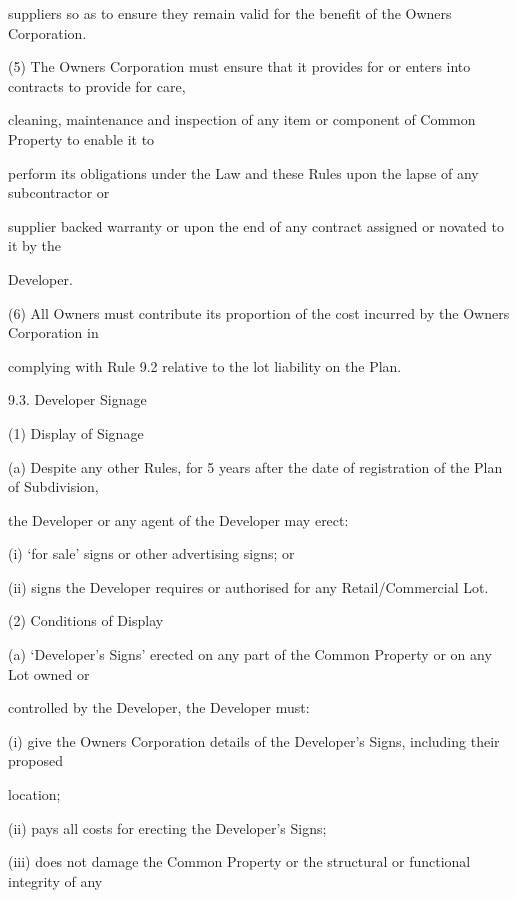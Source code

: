 \documentclass{article}
\begin{document}
{\fontsize{10.02}{1}suppliers so as to ensure they remain valid for the benefit of the Owners Corporation. }

{\fontsize{9.962}{1}(5) The Owners Corporation must ensure that it provides for or enters into contracts to provide for care, }

{\fontsize{10.02}{1}cleaning, maintenance and inspection of any item or component of Common Property to enable it to }

{\fontsize{10.02}{1}perform its obligations under the Law and these Rules upon the lapse of any subcontractor or }

{\fontsize{10.02}{1}supplier backed warranty or upon the end of any contract assigned or novated to it by the }

{\fontsize{10.02}{1}Developer. }

{\fontsize{9.962}{1}(6) All Owners must contribute its proportion of the cost incurred by the Owners Corporation in }

{\fontsize{10.02}{1}complying with Rule 9.2 relative to the lot liability on the Plan. }

{\fontsize{9.99}{1}9.3. Developer Signage }

{\fontsize{9.962}{1}(1) Display of Signage }

{\fontsize{9.962}{1}(a) Despite any other Rules, for 5 years after the date of registration of the Plan of Subdivision, }

{\fontsize{10.02}{1}the Developer or any agent of the Developer may erect: }

{\fontsize{9.962}{1}(i) ‘for sale’ signs or other advertising signs; or }

{\fontsize{9.962}{1}(ii) signs the Developer requires or authorised for any Retail/Commercial Lot. }

{\fontsize{9.962}{1}(2) Conditions of Display }

{\fontsize{9.962}{1}(a) ‘Developer’s Signs’ erected on any part of the Common Property or on any Lot owned or }

{\fontsize{10.02}{1}controlled by the Developer, the Developer must: }

{\fontsize{9.962}{1}(i) give the Owners Corporation details of the Developer’s Signs, including their proposed }

{\fontsize{10.02}{1}location; }

{\fontsize{9.962}{1}(ii) pays all costs for erecting the Developer’s Signs; }

{\fontsize{9.962}{1}(iii) does not damage the Common Property or the structural or functional integrity of any }
\end{document}
